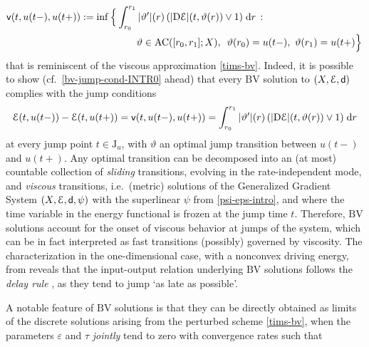 \documentclass[a4paper,10pt,reqno]{amsart} %
\numberwithin{equation}{section}
\def\rmD{{\mathrm D}} \def\rmE{{\mathrm E}} \def\rmF{{\mathrm F}}
\def\dd{\;\!\mathrm{d}} %
\newcommand{\eps}{\varepsilon}
\newcommand{\teta}{\vartheta}
\newcommand{\Xs}{X}
\newcommand{\AC}{\mathrm{AC}}
\newcommand{\BV}{\mathrm{BV}}
\newcommand{\mdn}{\mathsf{d}}
\newcommand{\ene}[2]{\mathcal{E}(#1,#2)}
\newcommand{\lli}[2]{{#1}({#2}{-})}
\newcommand{\rli}[2]{{#1}({#2}{+})}
\newcommand{\jump}[1]{\mathrm{J}_{#1}}
\newcommand{\bvcost}[3]{\mathsf{v}(#1,#2,#3)}
\newcommand{\RIS}{(\Xs,\calE,\mdn)}
\newcommand{\slope}[3]{|\rmD {#1}|(#2,#3)}
\begin{document}
 \begin{equation}
 \label{vcost-INTRO}
 \begin{aligned}
 \bvcost t{\lli u t }{\rli u t}: = \inf\Big\{
   & \int_{r_0}^{r_1}
|\teta'|(r) \left( \slope \calE t{\teta(r)} \vee 1 \right)  \dd r 
  \, :
  \\
   & 
 \qquad 
   \teta \in \AC([r_0,r_1];\Xs),\, \ \teta(r_0)=\lli u t , \ \teta(r_1) = \rli u t\Big\}\,
   \end{aligned}
\end{equation}
that is reminiscent of the viscous approximation \eqref{tims-bv}. %
Indeed, it is possible to show (cf.\ \eqref{bv-jump-cond-INTR0}
ahead) that every $\BV$ solution to $\RIS$ complies with the jump conditions
\begin{equation}
\begin{aligned}
\label{bv-jump-cond-INTR0}
\ene t{\lli u t } - \ene t{\rli ut}  = \bvcost t{\lli ut}{\rli u t} =    \int_{r_0}^{r_1}
|\teta'|(r) \left( \slope \calE t{\teta(r)} \vee 1 \right)  \dd r  %
\end{aligned}
 \end{equation}
at every jump point $t\in \jump u$, with $\teta$ an optimal jump transition between $\lli u t $ and $\rli u t$. Any optimal  transition can be decomposed into an (at most) countable collection of \emph{sliding} transitions, evolving in the rate-independent mode, and 
 \emph{viscous} transitions, i.e.\ (metric) solutions of the Generalized Gradient System $(\Xs,\calE,\mdn,\psi)$ with the superlinear $\psi$ from \eqref{psi-eps-intro},  and where the time variable in the energy functional is frozen at the jump time $t$. 
  Therefore, $\BV$ solutions account for 
 the onset of viscous behavior at jumps of the system, which can be in fact interpreted as fast transitions (possibly) governed by viscosity. The characterization in the one-dimensional case, with a nonconvex driving energy,  from \cite{RosSav12} reveals that the input-output relation underlying $\BV$  solutions follows the \emph{delay rule} 
 \cite{Visintin94}, as they tend to jump `as late as possible'.
 \par
 A notable feature of $\BV$ solutions is that they can be directly obtained as limits of the discrete solutions arising from the perturbed scheme \eqref{tims-bv}, when the parameters $\eps$ and $\tau$ \emph{jointly} tend to zero with convergence rates such that
\end{document}
